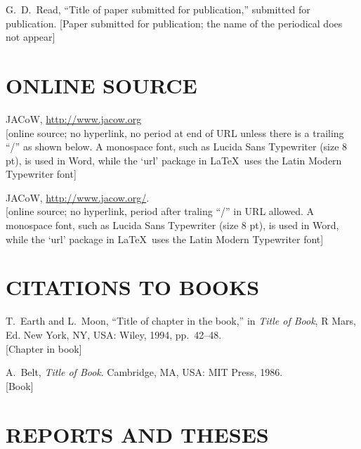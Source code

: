 \documentclass[letterpaper,  %
              ]{jacow-2_3}   %
\begin{document}
{{\begin{thebibliography}{99}
		G.~D.~Read, 
		“Title of paper submitted for publication,”
		submitted for publication.
	\textcolor{jblue}{[Paper submitted for publication; the name of the 
					  periodical does not appear]}
\end{thebibliography}

\section{ONLINE SOURCE}

\begin{thebibliography}{99} %
  \setcounter{enumi}{11}
		JACoW, \url{http://www.jacow.org} \\
		\textcolor{jvio}{[online source; no hyperlink, no period at end of URL
						  unless there is a trailing “/” as shown below. A monospace
						  font, such as Lucida Sans Typewriter (size 8 pt), is used in
					      Word, while the ‘url’ package in \LaTeX\ uses the Latin Modern Typewriter font]}

  \setcounter{enumi}{11}
		JACoW, \url{http://www.jacow.org/}.  \\
	\textcolor{jvio}{[online source; no hyperlink, period after traling “/” in
					 URL allowed. A monospace font, such as Lucida Sans Typewriter 
					 (size 8 pt), is used in Word, while the ‘url’ package in \LaTeX\  
					 uses the Latin Modern Typewriter font]}
\end{thebibliography}

\section{CITATIONS TO BOOKS}

\begin{thebibliography}{99} %
	\setcounter{enumi}{12}
		T.~Earth and L.~Moon, 
		“Title of chapter in the book,”
		in \emph{Title of Book}, R Mars, Ed. New York, NY, USA: 
		Wiley, 1994, pp.~42--48. \\
	\textcolor{jbook}{[Chapter in book]}
	
		A.~Belt, \emph{Title of Book}. Cambridge, MA, USA: 
		MIT Press, 1986. \\
	\textcolor{jbook}{[Book]}
\end{thebibliography}

\section{REPORTS AND THESES}

}}
\end{document}

